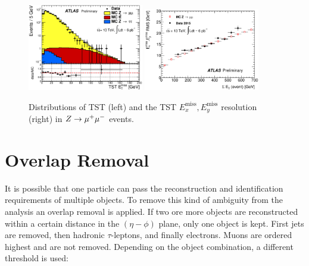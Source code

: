 \begin{figure}
    \begin{center}
        \includegraphics[width=0.45\textwidth]{./figures/object_selection/etmiss_performance_tst_zmm.eps}
        \includegraphics[width=0.45\textwidth]{./figures/object_selection/etmiss_resolution_tst_zmm.eps}
        \caption{Distributions of TST \etmiss{} (left) and the TST $E^\text{miss}_x, E^\text{miss}_y$ resolution (right)
        in $Z \to \mu^+\mu^-$ events.~\cite{ATL-PHYS-PUB-2015-027}}\label{fig:object_selection:etmiss}
    \end{center}
\end{figure}

\section{Overlap Removal}\label{sec:object_selection:overlap_removal}

It is possible that one particle can pass the reconstruction and identification requirements of multiple objects.
To remove this kind of ambiguity from the analysis an overlap removal is applied.
If two ore more objects are reconstructed within a certain distance \dr{} in the $(\eta - \phi)$ plane, only one object is kept.
First jets are removed, then hadronic $\tau$-leptons, and finally electrons.
Muons are ordered highest and are not removed.
Depending on the object combination, a different \dr{} threshold is used:

